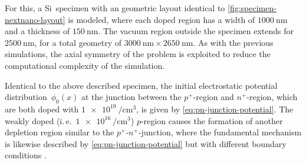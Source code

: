 For this, a Si~specimen with an geometric layout identical to \cref{fig:specimen-nextnano-layout} is modeled, where each doped region has a width of $\SI{1000}{\nm}$ and a thickness of $\SI{150}{\nm}$. The vacuum region outside the specimen extends for $\SI{2500}{\nm}$, for a total geometry of $\SI{3000}{\nm} \times \SI{2650}{\nm}$. As with the previous simulations, the axial symmetry of the problem is exploited to reduce the computational complexity of the simulation.

Identical to the above described specimen, the initial electrostatic potential distribution~$\phi_0 \left(x\right)$ at the junction between the $p^+$-region and $n^+$-region, which are both doped with $\SI[per-mode=power]{1e19}{\per\cubic\cm}$, is given by \cref{eq:pn-junction-potential}. The weakly doped (i.\,e.\ $\SI[per-mode=power]{1e16}{\per\cubic\cm}$) $p$-region causes the formation of another depletion region similar to the $p^+$-$n^+$-junction, where the fundamental mechanism is likewise described by \cref{eq:pn-junction-potential} but with different boundary conditions \cite{Sabnis1978}.

